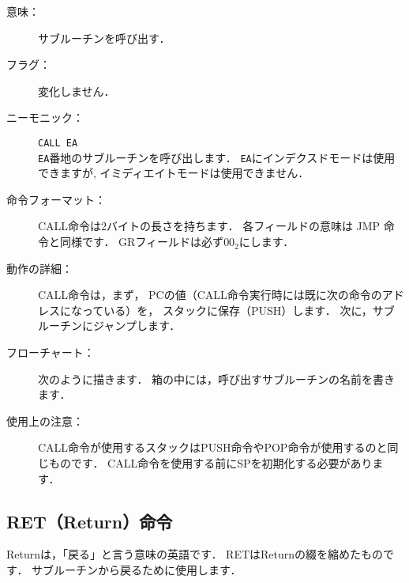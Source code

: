 \begin{description}
\item[意味：]サブルーチンを呼び出す．

\item[フラグ：]変化しません．

\item[ニーモニック：]{\tt CALL  EA} \\
{\tt EA}番地のサブルーチンを呼び出します．
{\tt EA}にインデクスドモードは使用できますが,
イミディエイトモードは使用できません．

\item[命令フォーマット：] CALL命令は2バイトの長さを持ちます．
各フィールドの意味は JMP 命令と同様です．
GRフィールドは必ず$00_2$にします．


\item[動作の詳細：] CALL命令は，まず，
PCの値（CALL命令実行時には既に次の命令のアドレスになっている）を，
スタックに保存（PUSH）します．
次に，サブルーチンにジャンプします．

\item[フローチャート：]
次のように描きます．
箱の中には，呼び出すサブルーチンの名前を書きます．

\begin{center}
\end{center}

\item[使用上の注意：]
CALL命令が使用するスタックはPUSH命令やPOP命令が使用するのと同じものです．
CALL命令を使用する前にSPを初期化する必要があります．

\end{description}

\newpage
\subsection{RET（Return）命令}

Returnは，「戻る」と言う意味の英語です．
RETはReturnの綴を縮めたものです．
サブルーチンから戻るために使用します．

